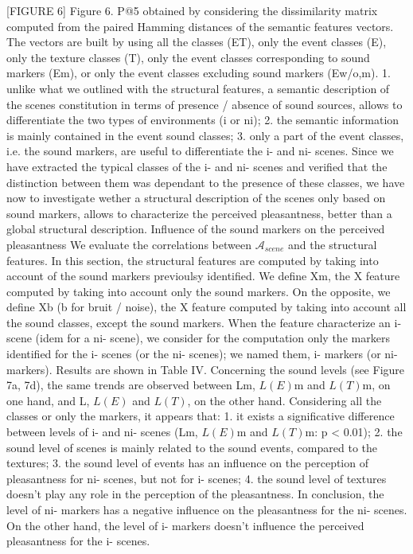 [FIGURE 6] Figure 6. P@5 obtained by considering the dissimilarity matrix computed from the paired Hamming distances of the semantic features vectors. The vectors are built by using all the classes (ET), only the event classes (E), only the texture classes (T), only the event classes corresponding to sound markers (Em), or only the event classes excluding sound markers (Ew/o,m).
1. unlike what we outlined with the structural features, a semantic description of the scenes constitution in terms of presence / absence of sound sources, allows to differentiate the two types of environments (i or ni); 2. the semantic information is mainly contained in the event sound classes; 3. only a part of the event classes, i.e. the sound markers, are useful to differentiate the i- and ni- scenes.
Since we have extracted the typical classes of the i- and ni- scenes and verified that the distinction between them was dependant to the presence of these classes, we have now to investigate wether a structural description of the scenes only based on sound markers, allows to characterize the perceived pleasantness, better than a global structural description.
Influence of the sound markers on the perceived pleasantness We evaluate the correlations between $\mathcal{A}_{scene}$ and the structural features. In this section, the structural features are computed by taking into account of the sound markers previoulsy identified. We define Xm, the X feature computed by taking into account only the sound markers. On the opposite, we define Xb (b for bruit / noise), the X feature computed by taking into account all the sound classes, except the sound markers. When the feature characterize an i- scene (idem for a ni- scene), we consider for the computation only the markers identified for the i- scenes (or the ni- scenes); we named them, i- markers (or ni- markers). Results are shown in Table IV. Concerning the sound levels (see Figure 7a, 7d), the same trends are observed between Lm, $L(E)$m and $L(T)$m, on one hand, and L, $L(E)$ and $L(T)$, on the other hand. Considering all the classes or only the markers, it appears that: 1. it exists a significative difference between levels of i- and ni- scenes (Lm, $L(E)$m and $L(T)$m: p < 0.01); 2. the sound level of scenes is mainly related to the sound events, compared to the textures; 3. the sound level of events has an influence on the perception of pleasantness for ni- scenes, but not for i- scenes; 4. the sound level of textures doesn’t play any role in the perception of the pleasantness.
In conclusion, the level of ni- markers has a negative influence on the pleasantness for the ni- scenes. On the other hand, the level of i- markers doesn’t influence the perceived pleasantness for the i- scenes.
